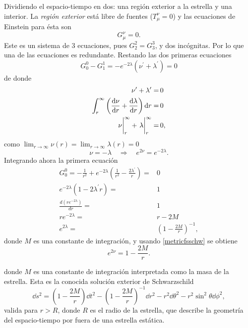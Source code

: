 Dividiendo el espacio-tiempo en dos: una región exterior a la estrella y una interior. 
La \textit{región exterior} está libre de fuentes ($T _ { \mu } ^ { \nu }=0$) y las ecuaciones de Einstein para ésta son 
\begin{equation}
    G _ { \mu } ^ { \nu } = 0.
\end{equation}
Este es un sistema de 3 ecuaciones, pues $ G _ { 2 } ^ { 2}=G _ { 3 } ^ { 3}$, y dos incógnitas. Por lo que una de las ecuaciones es redundante.
Restando las dos primeras ecuaciones
\begin{equation}
    G _ { 0 } ^ { 0} - G _ { 1 } ^ { 1} = -e^{-2\lambda} (\nu^{\prime}+\lambda^{\prime}) = 0 
\end{equation}
de donde
\begin{align}
    \nu^{\prime}+\lambda^{\prime} =& \,0 \\
    \int_{r}^{\infty} \qty(\dv{\nu}{r}+\dv{\lambda}{r})\dd{r} =& \,0 \\
    \eval{\nu}_{r}^{\infty} + \eval{\lambda}_{r}^{\infty} =& \, 0,
\end{align}
como $\lim_{r\to \infty}\nu(r)=\lim_{r\to \infty}\lambda(r)=0$
\begin{equation}
    \nu=-\lambda \quad \Longrightarrow \quad e^{2\nu}=e^{-2\lambda}. \label{metricfsschw}
\end{equation}
Integrando ahora la primera ecuación
\begin{align}
    G _ { 0 } ^ { 0} = -\frac{1}{r^{2}}+e^{-2\lambda}\left(\frac{1}{r^{2}}-\frac{2 \lambda^{\prime}}{r}\right) =& 0 \\
    e^{-2\lambda}\left(1-2 \lambda^{\prime} r \right) =& 1 \\
    \frac{d\left(r e^{-2 \lambda}\right)}{d r} =& 1 \\ 
    r e^{-2 \lambda} =& r - 2 M \\
    e^{2 \lambda} =& \left(1-\frac{2 M}{r}\right)^{-1},
\end{align}
donde $M$ es una constante de integración, y usando \eqref{metricfsschw} se obtiene
\begin{equation}
    e^{2\nu}=1-\frac{2 M}{r}.
\end{equation}

donde $M$ es una constante de integración interpretada como la masa de la estrella. Esta es la conocida solución exterior de Schwarzschild
\begin{equation}
    \dd{s} ^ { 2 } =  \left( 1 - \frac { 2 M } { r } \right) \dd{t} ^ { 2 } - \left( 1 - \frac { 2 M } { r } \right) ^ { - 1 } \dd{r} ^ { 2 }  - r ^ { 2 } \dd{\theta} ^ { 2 } - r ^ { 2 } \sin ^ { 2 } \theta \dd{\phi} ^ { 2 }, \label{schwarzs}
\end{equation}
valida para $r>R$, donde $R$ es el radio de la estrella, que describe la geometría del espacio-tiempo por fuera de una estrella estática.

